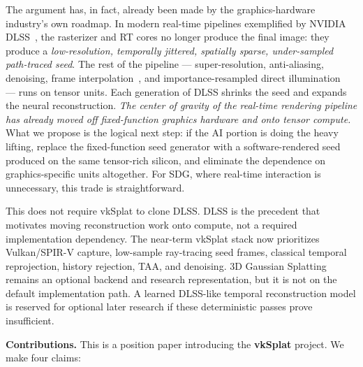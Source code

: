 \documentclass[10pt,journal]{IEEEtran}
\begin{document}
The argument has, in fact, already been made by the
graphics-hardware industry's own roadmap. In modern real-time pipelines
exemplified by NVIDIA DLSS~\cite{nvidia-dlss,liu2020nsrr,nvidia-dlss3},
the rasterizer and RT cores no longer produce the final image: they
produce a \emph{low-resolution, temporally jittered, spatially sparse,
under-sampled path-traced seed}. The rest of the pipeline ---
super-resolution, anti-aliasing, denoising, frame
interpolation~\cite{schied2017svgf,chaitanya2017interactive,nvidia-nrd},
and importance-resampled direct illumination~\cite{bitterli2020restir} ---
runs on tensor units. Each generation of DLSS shrinks the seed and
expands the neural reconstruction. \emph{The center of gravity of the
real-time rendering pipeline has already moved off fixed-function
graphics hardware and onto tensor compute.} What we propose is the
logical next step: if the AI portion is doing the heavy lifting, replace
the fixed-function seed generator with a software-rendered seed produced
on the same tensor-rich silicon, and eliminate the dependence on
graphics-specific units altogether. For SDG, where real-time interaction
is unnecessary, this trade is straightforward.

This does not require vkSplat to clone DLSS. DLSS is the precedent that
motivates moving reconstruction work onto compute, not a required
implementation dependency. The near-term vkSplat stack now prioritizes
Vulkan/SPIR-V capture, low-sample ray-tracing seed frames, classical
temporal reprojection, history rejection, TAA, and denoising. 3D
Gaussian Splatting remains an optional backend and research
representation, but it is not on the default implementation path. A
learned DLSS-like temporal reconstruction model is reserved for optional
later research if these deterministic passes prove insufficient.

\textbf{Contributions.} This is a position paper introducing the
\textbf{vkSplat} project. We make four claims:
\end{document}
